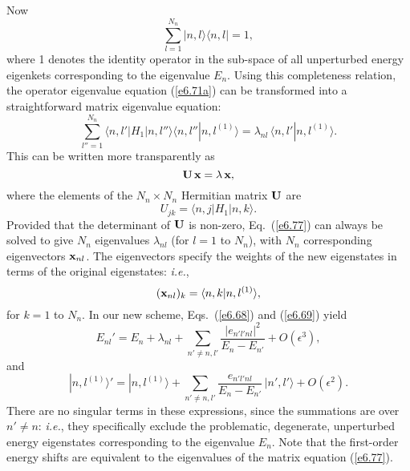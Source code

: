 Now
\begin{equation}
\sum_{l=1}^{N_n} |n,l\rangle \langle n,l| = 1,
\end{equation}
where 1 denotes the identity operator in the sub-space of all unperturbed
energy eigenkets corresponding to the eigenvalue $E_n$. Using this completeness
relation, the operator eigenvalue equation (\ref{e6.71a}) can be transformed into a 
straightforward matrix eigenvalue equation:
\begin{equation}
\sum_{l''=1}^{N_n}\langle n, l'|H_1|n, l''\rangle \langle n, l''|n, l^{(1)}\rangle
= \lambda_{nl}\, \langle n, l'| n, l^{(1)}\rangle. 
\end{equation}
This can be written more transparently as
\begin{equation}\label{e6.77}
{\bf U} \,{\bf x} = \lambda \,{\bf x},
\end{equation}
where the elements of the $N_n\times N_n$  Hermitian matrix ${\bf U}$ are
\begin{equation}\label{e6.78}
U_{jk} = \langle n, j| H_1| n, k\rangle.
\end{equation}
Provided that the determinant of ${\bf U}$ is non-zero, Eq.~(\ref{e6.77})  can always be solved to
give $N_n$ eigenvalues $\lambda_{nl}$ (for $l=1$ to $N_n$), with
$N_n$ corresponding eigenvectors ${\bf x}_{nl}$. The eigenvectors specify the
weights of the new eigenstates in terms of the original eigenstates: {\em i.e.},
\begin{equation}
({\bf x}_{nl})_k = \langle n, k|n, l^{(1)}\rangle,
\end{equation}
for $k=1$ to $N_n$. In our new scheme, Eqs.~(\ref{e6.68}) and (\ref{e6.69}) yield
\begin{equation}
E_{nl}' = E_n + \lambda_{nl} + \sum_{n'\neq n, l'}
\frac{|e_{n'l'nl}|^2}{E_n - E_{n'}} + O(\epsilon^3),
\end{equation}
and
\begin{equation}
|n, l^{(1)}\rangle' = |n,l^{(1)}\rangle + \sum_{n'\neq n, l'}
\frac{e_{n'l'nl}}{E_n-E_{n'}}\,|n',l'\rangle + O(\epsilon^2).
\end{equation}
There are no singular terms in these expressions, since the summations
are over $n'\neq n$: {\em i.e.}, they specifically exclude
the problematic, 
degenerate, unperturbed energy eigenstates corresponding to the eigenvalue $E_n$. 
Note that the first-order energy shifts are equivalent to the eigenvalues
of the matrix equation (\ref{e6.77}).

